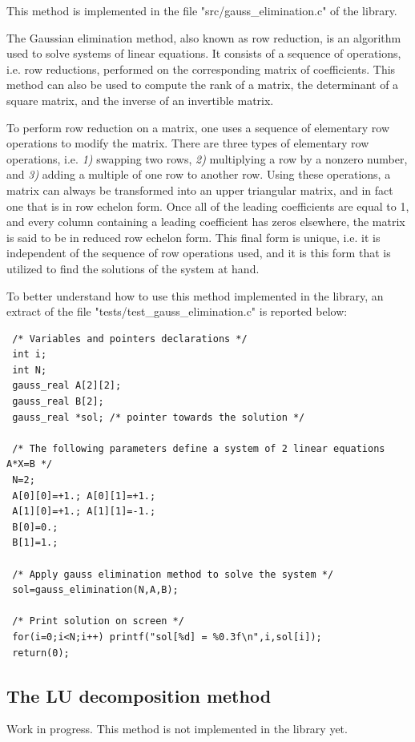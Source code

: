 \documentclass{book}
\begin{document}
This method is implemented in the file "src/gauss\_elimination.c" of the library.

The Gaussian elimination method, also known as row reduction, is an algorithm used to
solve systems of linear equations. It consists of a sequence of operations, i.e. row reductions, performed
on the corresponding matrix of coefficients. This method can also be used to compute
the rank of a matrix, the determinant of a square matrix, and the inverse of an invertible matrix. 

To perform row reduction on a matrix, one uses a sequence of elementary row operations to modify
the matrix. There are three types of elementary row operations, i.e. {\sl{1)}} swapping two rows,
{\sl{2)}} multiplying a row by a nonzero number, and {\sl{3)}} adding a multiple of one row to another row.
Using these operations, a matrix can always be transformed into an upper triangular matrix, and in fact one
that is in row echelon form. Once all of the leading coefficients are equal to 1, and every column containing
a leading coefficient has zeros elsewhere, the matrix is said to be in reduced row echelon form.
This final form is unique, i.e. it is independent of the sequence of row operations used, and it is this form
that is utilized to find the solutions of the system at hand.

To better understand how to use this method implemented in the library, an extract of the file "tests/test\_gauss\_elimination.c" is reported below:
\begin{lstlisting}
 /* Variables and pointers declarations */
 int i;
 int N;
 gauss_real A[2][2];
 gauss_real B[2];
 gauss_real *sol; /* pointer towards the solution */

 /* The following parameters define a system of 2 linear equations A*X=B */
 N=2;
 A[0][0]=+1.; A[0][1]=+1.;
 A[1][0]=+1.; A[1][1]=-1.;
 B[0]=0.;
 B[1]=1.;

 /* Apply gauss elimination method to solve the system */
 sol=gauss_elimination(N,A,B);

 /* Print solution on screen */
 for(i=0;i<N;i++) printf("sol[%d] = %0.3f\n",i,sol[i]);
 return(0);
\end{lstlisting}

\subsection{The LU decomposition method}

Work in progress. This method is not implemented in the library yet.
\end{document}
